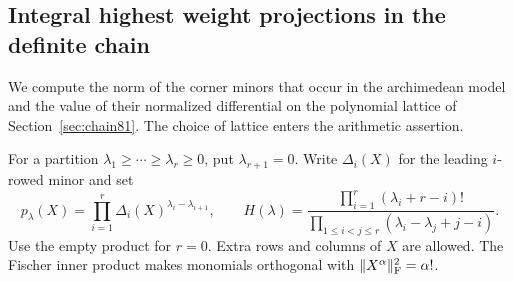 \documentclass[a4paper,11pt]{article}
\theoremstyle{definition}
\theoremstyle{remark}
\numberwithin{equation}{section}
\begin{document}
\subsection{Integral highest weight projections in the definite chain}\label{nav:VI-05}
\label{sec:hooks86}

We compute the norm of the corner minors that occur in the
archimedean model and the value of their normalized differential
on the polynomial lattice of Section~\ref{sec:chain81}. The choice
of lattice enters the arithmetic assertion.

For a partition \(\lambda_1\ge\cdots\ge\lambda_r\ge0\), put
\(\lambda_{r+1}=0\). Write \(\Delta_i(X)\) for the leading
\(i\)-rowed minor and set
\[
 p_\lambda(X)=\prod_{i=1}^r\Delta_i(X)^{\lambda_i-\lambda_{i+1}},
 \qquad H(\lambda)=
 \frac{\prod_{i=1}^r(\lambda_i+r-i)!}
      {\prod_{1\le i<j\le r}(\lambda_i-\lambda_j+j-i)} .
\]
Use the empty product for \(r=0\). Extra rows and columns of \(X\)
are allowed. The Fischer inner product makes monomials orthogonal
with \(\|X^\alpha\|_{\rm F}^2=\alpha!\).
\end{document}
